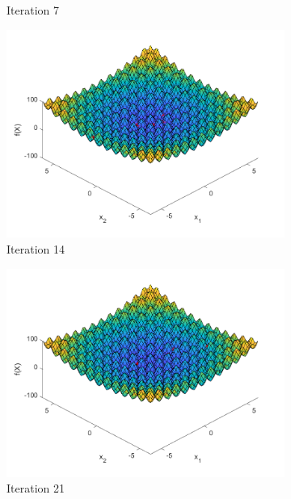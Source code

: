 \begin{figure}
\begin{subfigure}[b]{0.4\textwidth}
    \caption{Iteration 7}
    \label{fig:s3-iter-1}
  \end{subfigure}
  \begin{subfigure}[b]{0.4\textwidth}
    \includegraphics[width=\textwidth]{img/smpl/rast2d/loa-iter-14}
    \caption{Iteration 14}
    \label{fig:s3-iter-2}
  \end{subfigure}
  \begin{subfigure}[b]{0.4\textwidth}
    \includegraphics[width=\textwidth]{img/smpl/rast2d/loa-iter-21}
    \caption{Iteration 21}
    \label{fig:s3-iter-3}
  \end{subfigure}
  \begin{subfigure}[b]{0.4\textwidth}

\end{subfigure}
\end{figure}
